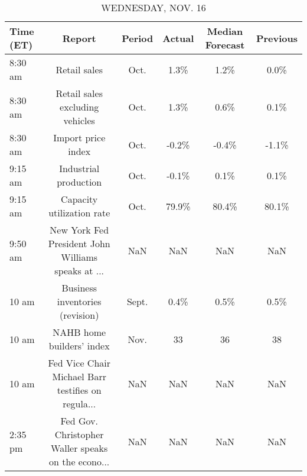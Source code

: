 \documentclass{article}%
\begin{document}
%


\begin{table}[htbp]%
\caption{WEDNESDAY, NOV. 16}%
\centering%
\begin{adjustbox}{width=1\textwidth}%
\begin{tabular}{lccccc}
\toprule
Time (ET) &                                             Report & Period & Actual & Median Forecast & Previous \\
\midrule
  8:30 am &                                       Retail sales &   Oct. &   1.3\% &            1.2\% &     0.0\% \\
  8:30 am &                    Retail sales excluding vehicles &   Oct. &   1.3\% &            0.6\% &     0.1\% \\
  8:30 am &                                 Import price index &   Oct. &  -0.2\% &           -0.4\% &    -1.1\% \\
  9:15 am &                              Industrial production &   Oct. &  -0.1\% &            0.1\% &     0.1\% \\
  9:15 am &                          Capacity utilization rate &   Oct. &  79.9\% &           80.4\% &    80.1\% \\
  9:50 am & New York Fed President John Williams speaks at ... &    NaN &    NaN &             NaN &      NaN \\
    10 am &                    Business inventories (revision) &  Sept. &   0.4\% &            0.5\% &     0.5\% \\
    10 am &                          NAHB home builders' index &   Nov. &     33 &              36 &       38 \\
    10 am & Fed Vice Chair Michael Barr testifies on regula... &    NaN &    NaN &             NaN &      NaN \\
  2:35 pm & Fed Gov. Christopher Waller speaks on the econo... &    NaN &    NaN &             NaN &      NaN \\
\bottomrule
\end{tabular}
%
\end{adjustbox}%
\end{table}

%
\end{document}
